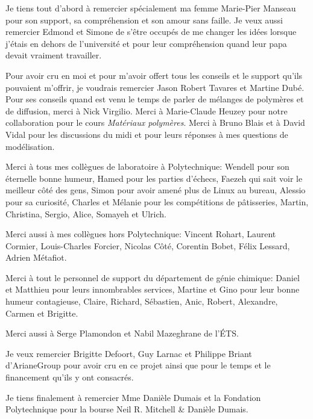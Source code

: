 %
%
Je tiens tout d'abord à remercier spécialement ma femme Marie-Pier Manseau pour son support, sa compréhension et son amour sans faille. 
Je veux aussi remercier Edmond et Simone de s'être occupés de me changer les idées lorsque j'étais en dehors de l'université et pour leur compréhension quand leur papa devait vraiment travailler. 

Pour avoir cru en moi et pour m'avoir offert tous les conseils et le support qu'ils pouvaient m'offrir, je voudrais remercier Jason Robert Tavares et Martine Dubé. 
Pour ses conseils quand est venu le temps de parler de mélanges de polymères et de diffusion, merci à Nick Virgilio. 
Merci à Marie-Claude Heuzey pour notre collaboration pour le cours \textit{Matériaux polymères}. 
Merci à Bruno Blais et à David Vidal pour les discussions du midi et pour leurs réponses à mes questions de modélisation. 

Merci à tous mes collègues de laboratoire à Polytechnique: Wendell pour son éternelle bonne humeur, Hamed pour les parties d'échecs, Faezeh qui sait voir le meilleur côté des gens, Simon pour avoir amené plus de Linux au bureau, Alessio pour sa curiosité, Charles et Mélanie pour les compétitions de pâtisseries, Martin, Christina, Sergio, Alice, Somayeh et Ulrich.

Merci aussi à mes collègues hors Polytechnique: Vincent Rohart, Laurent Cormier, Louis-Charles Forcier, Nicolas Côté, Corentin Bobet, Félix Lessard, Adrien Métafiot. 

Merci à tout le personnel de support du département de génie chimique: Daniel et Matthieu pour leurs innombrables services, Martine et Gino pour leur bonne humeur contagieuse, Claire, Richard, Sébastien, Anic, Robert, Alexandre, Carmen et Brigitte. 

Merci aussi à Serge Plamondon et Nabil Mazeghrane de l'ÉTS. 

Je veux remercier Brigitte Defoort, Guy Larnac et Philippe Briant d'ArianeGroup pour avoir cru en ce projet ainsi que pour le temps et le financement qu'ils y ont consacrés. 

Je tiens finalement à remercier Mme Danièle Dumais et la Fondation Polytechnique pour la bourse Neil R. Mitchell \& Danièle Dumais. 
